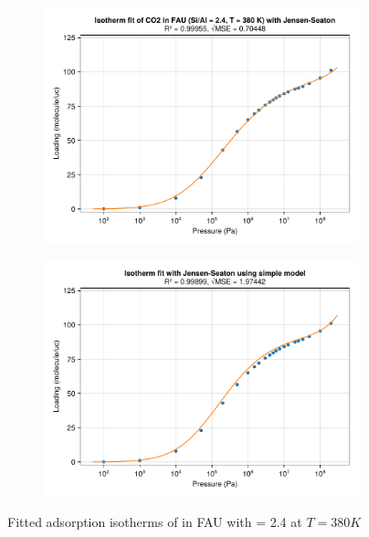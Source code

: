 \documentclass[main.tex]{subfiles}
\begin{document}
\begin{figure}
	\begin{subfigure}{0.49\columnwidth}
		\includegraphics[width=\columnwidth]{figures/isotherms/referencefit_jsfit.pdf}
	\end{subfigure}\hfill%
	\begin{subfigure}{0.49\columnwidth}
		\includegraphics[width=\columnwidth]{figures/isotherms/referencefit_simplemodel.pdf}
	\end{subfigure}
	\caption{Fitted adsorption isotherms of  in FAU with \SiAl = 2.4 at $T = \qty{380}K$}\label{fig:simplemodelfit}
\end{figure}
\end{document}

